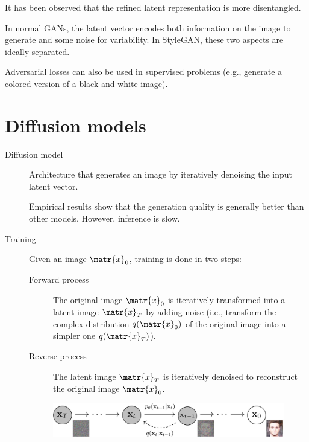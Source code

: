 \begin{description}
        \begin{remark}
            It has been observed that the refined latent representation is more disentangled.
        \end{remark}

        \begin{remark}
            In normal GANs, the latent vector encodes both information on the image to generate and some noise for variability. In StyleGAN, these two aspects are ideally separated.
        \end{remark}
\end{description}

\begin{remark}
    Adversarial losses can also be used in supervised problems (e.g., generate a colored version of a black-and-white image).
\end{remark}



\section{Diffusion models}

\begin{description}
    \item[Diffusion model] 
        Architecture that generates an image by iteratively denoising the input latent vector.

        \begin{remark}
            Empirical results show that the generation quality is generally better than other models. However, inference is slow.
        \end{remark}

    \item[Training]
        Given an image $\matr{x}_0$, training is done in two steps:
        \begin{description}
            \item[Forward process] 
                The original image $\matr{x}_0$ is iteratively transformed into a latent image $\matr{x}_T$ by adding noise (i.e., transform the complex distribution $q(\matr{x}_0)$ of the original image into a simpler one $q(\matr{x}_T)$).
            \item[Reverse process] 
                The latent image $\matr{x}_T$ is iteratively denoised to reconstruct the original image $\matr{x}_0$.
        \end{description} 

        \begin{figure}[H]
            \centering
            \includegraphics[width=0.8\linewidth]{./img/diffusion_model.jpg}
        \end{figure}
\end{description}


